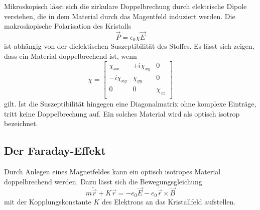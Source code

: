 \noindent
Mikroskopisch lässt sich die zirkulare Doppelbrechung durch elektrische Dipole verstehen, die in dem Material durch das 
Magentfeld induziert werden. Die makroskopische Polarisation des Kristalls 
\begin{equation*}
    \vec{P}=\epsilon_0\chi\vec{E}
\end{equation*}
ist abhängig von der dielektischen Suszeptibilität des Stoffes. Es lässt sich zeigen, dass ein Material doppelbrechend ist, wenn
\begin{equation}
    \chi=
    \left[
        \begin{array}{ccc}
        \chi_{xx}          & +i\chi_{xy} & 0         \\ 
        -i\chi_{xy}   & \chi_{yy}        & 0         \\
        0                  & 0                & \chi_{zz} \\ 
    \end{array}
    \right]
    \label{eqn:chi}
\end{equation}
gilt. Ist die Suszeptibilität hingegen eine Diagonalmatrix ohne komplexe Einträge, tritt keine Doppelbrechung auf. Ein solches 
Material wird als optisch isotrop bezeichnet. 

\subsection{Der Faraday-Effekt}
Durch Anlegen eines Magnetfeldes kann ein optisch isotropes Material doppelbrechend werden. Dazu lässt sich die Bewegungsgleichung
\begin{equation*}
    m\ddot{\vec{r}}+K\vec{r}=-e_0\vec{E}-e_0\dot{\vec{r}}\times\vec{B}
\end{equation*}
mit der Kopplungskonstante $K$ des Elektrons an das Kristallfeld aufstellen.

